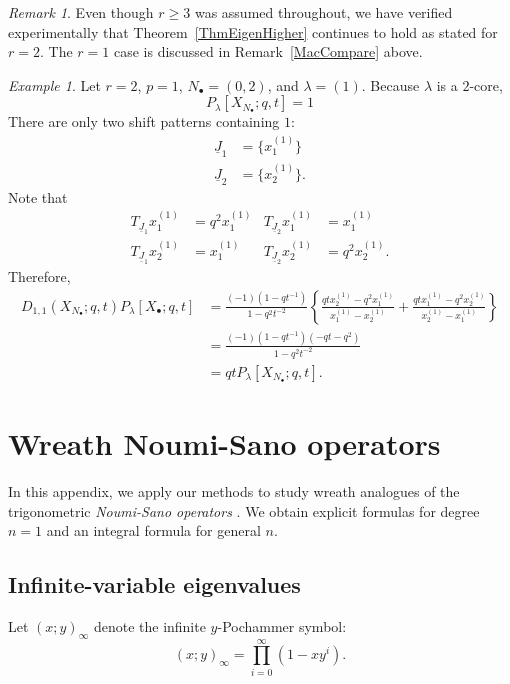 \documentclass{amsart}
\newcommand{\Ju}{{\underline{J}}}
\theoremstyle{remark}
\newtheorem{rem}[thm]{Remark}
\newtheorem{ex}[thm]{Example}
\numberwithin{thm}{section}
\numberwithin{equation}{section}
\begin{document}
\begin{rem}\label{Rmk2Colors}
Even though $r\ge 3$ was assumed throughout, we have verified experimentally that Theorem~\ref{ThmEigenHigher} continues to hold as stated for $r=2$. 
The $r=1$ case is discussed in Remark~\ref{MacCompare} above.
\end{rem}

\begin{ex}
Let $r=2$, $p=1$, $N_\bullet=(0,2)$, and $\lambda=(1)$.
Because $\lambda$ is a $2$-core,
\[
P_\lambda[X_{N_\bullet};q,t]=1
\]
There are only two shift patterns containing $1$:
\begin{align*}
    \Ju_1&=\{x_1^{(1)}\}\\
    \Ju_2&=\{x_2^{(1)}\}.
\end{align*}
Note that
\begin{align*}
    T_{\Ju_1}x_1^{(1)}&=q^2x_1^{(1)} & T_{\Ju_2}x_1^{(1)}&=x_1^{(1)}\\
    T_{\Ju_1}x_2^{(1)}&=x_1^{(1)} & T_{\Ju_2}x_2^{(1)}&=q^2x_2^{(1)}.
\end{align*}
Therefore,
\begin{align*}
    D_{1,1}(X_{N_\bullet};q,t)P_\lambda[X_{\bullet};q,t]&=
    \frac{(-1)(1-qt^{-1})}{1-q^2t^{-2}}
    \left\{
    \frac{qtx_2^{(1)}-q^2x_1^{(1)}}{x_1^{(1)}-x_2^{(1)}}+\frac{qtx_1^{(1)}-q^2x_2^{(1)}}{x_2^{(1)}-x_1^{(1)}}
    \right\}\\
    &=\frac{(-1)(1-qt^{-1})(-qt-q^2)}{1-q^2t^{-2}}\\
    &=qtP_\lambda[X_{N_\bullet};q,t].
\end{align*}
\end{ex}

\appendix

\section{Wreath Noumi-Sano operators}
In this appendix, we apply our methods to study wreath analogues of the trigonometric \textit{Noumi-Sano operators} \cite{NSa}.
We obtain explicit formulas for degree $n=1$ and an integral formula for general $n$.

\subsection{Infinite-variable eigenvalues}
Let $(x;y)_\infty$ denote the infinite $y$-Pochammer symbol:
\[
(x;y)_\infty=\prod_{i=0}^{\infty}(1-xy^i).
\]
\end{document}
